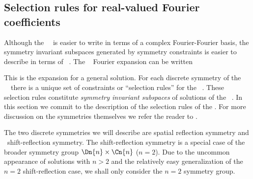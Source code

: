 

\subsection{Selection rules for real-valued Fourier coefficients}





Although the \spt\ \KSe\ is easier to write in terms of a complex
Fourier-Fourier basis, the symmetry invariant subspaces generated
by symmetry constraints is easier to describe in terms of \rv\ \Fcs.
The \rv\
{\spt} Fourier expansion can be written

This is the expansion for a general {\spt} solution. For each discrete
symmetry of the \spt\ \KSe\ there is a unique set of constraints or
``selection rules'' for the \spt\ \Fcs. These selection rules constitute
\textit{symmetry invariant subspaces} of solutions of the \spt\ \KSe. In
this section we commit to the description of the selection rules of the
\Fcs. For more discussion on the symmetries themselves we refer the
reader to \refsect{sect:KSsymm}.

The two discrete symmetries we will describe are spatial reflection
symmetry and \spt\ shift-reflection symmetry. The shift-reflection
symmetry is a special case of the broader symmetry group $\Dn{n}\times
\Cn{n}$ ($n=2$). Due to the uncommon appearance of solutions with $n>2$
and the relatively easy generalization of the $n=2$ shift-reflection
case, we shall only consider the $n=2$ symmetry group.

